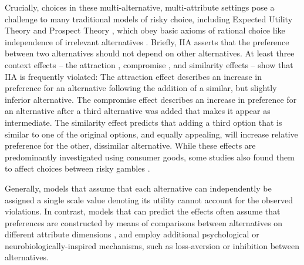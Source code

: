 \documentclass[11pt, a4paper]{article}
\begin{document}
Crucially, choices in these multi-alternative, multi-attribute settings pose a challenge to many traditional models of risky choice, including Expected Utility Theory \parencite[EU;][]{vonneumann1947TheoryGamesEconomic} and Prospect Theory \parencite{kahneman1979ProspectTheoryAnalysis,tversky1992AdvancesProspectTheory}, which obey basic axioms of rational choice like independence of irrelevant alternatives \parencite[IIA;][]{luce1959IndividualChoiceBehavior}. Briefly, IIA asserts that the preference between two alternatives should not depend on other alternatives. At least three context effects – the attraction \parencite{huber1982AddingAsymmetricallyDominated}, compromise \parencite{simonson1989ChoiceBasedReasons}, and similarity \parencite{tversky1972EliminationAspectsTheory} effects – show that IIA is frequently violated: The attraction effect describes an increase in preference for an alternative following the addition of a similar, but slightly inferior alternative. The compromise effect describes an increase in preference for an alternative after a third alternative was added that makes it appear as intermediate. The similarity effect predicts that adding a third option that is similar to one of the original options, and equally appealing, will increase relative preference for the other, dissimilar alternative. While these effects are predominantly investigated using consumer goods, some studies also found them to affect choices between risky gambles \parencite{huber1982AddingAsymmetricallyDominated,mohr2017AttractionEffectRisky,soltani2012RangeNormalizationModelContextDependent,tversky1972EliminationAspectsTheory,wedell1991DistinguishingModelsContextually}.

Generally, models that assume that each alternative can independently be assigned a single scale value denoting its utility \parencite[fixed utility or simple scalability models;][]{rieskamp2006ExtendingBoundsRationality} cannot account for the observed violations. In contrast, models that can predict the effects often assume that preferences are constructed by means of comparisons between alternatives on different attribute dimensions \parencite{roe2001MultialternativeDecisionField,trueblood2014MultiattributeLinearBallistic,tversky1972EliminationAspectsTheory,usher2004LossAversionInhibition,tversky1993ContextDependentPreferences}, and employ additional psychological or neurobiologically-inspired mechanisms, such as loss-aversion or inhibition between alternatives.
\end{document}
